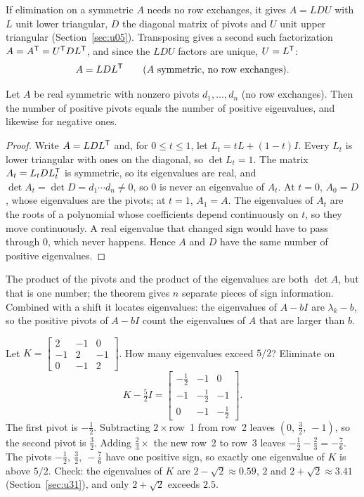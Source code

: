 If elimination on a symmetric $A$ needs no row exchanges, it gives $A=LDU$ with $L$ unit lower
triangular, $D$ the diagonal matrix of pivots and $U$ unit upper triangular
(Section~\ref{sec:u05}). Transposing gives a second such factorization $A=A^{\mathsf{T}}=U^{\mathsf{T}} DL^{\mathsf{T}}$, and
since the $LDU$ factors are unique, $U=L^{\mathsf{T}}$:
\[
  A=LDL^{\mathsf{T}}\qquad (A \text{ symmetric, no row exchanges}).
\]

\begin{theorem}\label{thm:u29-signs}
Let $A$ be real symmetric with nonzero pivots $d_1,\dots,d_n$ (no row exchanges). Then the
number of positive pivots equals the number of positive eigenvalues, and likewise for
negative ones.
\end{theorem}
\begin{proof}
Write $A=LDL^{\mathsf{T}}$ and, for $0\le t\le 1$, let $L_t=tL+(1-t)I$. Every $L_t$ is lower triangular with
ones on the diagonal, so $\det L_t=1$. The matrix $A_t=L_tDL_t^{\mathsf{T}}$ is symmetric, so its eigenvalues
are real, and $\det A_t=\det D=d_1\cdots d_n\ne 0$, so $0$ is never an eigenvalue of $A_t$. At
$t=0$, $A_0=D$, whose eigenvalues are the pivots; at $t=1$, $A_1=A$. The eigenvalues of $A_t$ are
the roots of a polynomial whose coefficients depend continuously on $t$, so they move
continuously. A real eigenvalue that changed sign would have to pass through $0$, which never
happens. Hence $A$ and $D$ have the same number of positive eigenvalues.
\end{proof}

The product of the pivots and the product of the eigenvalues are both $\det A$, but that is
one number; the theorem gives $n$ separate pieces of sign information. Combined with a shift
it locates eigenvalues: the eigenvalues of $A-bI$ are $\lambda_k-b$, so the positive pivots of
$A-bI$ count the eigenvalues of $A$ that are larger than $b$.

\begin{example}\label{ex:u29-shift}
Let $K=\begin{bmatrix}2&-1&0\\-1&2&-1\\0&-1&2\end{bmatrix}$. How many eigenvalues exceed $5/2$?
Eliminate on
\[
  K-\tfrac52 I=\begin{bmatrix}-\tfrac12&-1&0\\-1&-\tfrac12&-1\\0&-1&-\tfrac12\end{bmatrix}.
\]
The first pivot is $-\tfrac12$. Subtracting $2\times$row~1 from row~2 leaves
$(0,\ \tfrac32,\ -1)$, so the second pivot is $\tfrac32$. Adding $\tfrac23\times$ the new row~2
to row~3 leaves $-\tfrac12-\tfrac23=-\tfrac76$. The pivots $-\tfrac12,\ \tfrac32,\ -\tfrac76$ have one
positive sign, so exactly one eigenvalue of $K$ is above $5/2$. Check: the eigenvalues of $K$
are $2-\sqrt2\approx0.59$, $2$ and $2+\sqrt2\approx3.41$ (Section~\ref{sec:u31}), and only
$2+\sqrt2$ exceeds $2.5$.
\end{example}

